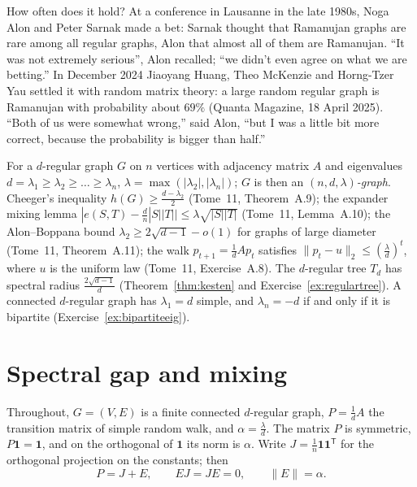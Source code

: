 How often does it hold? At a conference in Lausanne in the late 1980s, Noga Alon and Peter Sarnak made a bet: Sarnak thought that Ramanujan graphs are rare among all regular graphs, Alon that almost all
of them are Ramanujan. ``It was not extremely serious'', Alon recalled; ``we didn't even agree on what we are betting.'' In December 2024 Jiaoyang Huang, Theo McKenzie and Horng-Tzer Yau settled it with
random matrix theory: a large random regular graph is Ramanujan with probability about $69\%$ (Quanta Magazine, 18 April 2025). ``Both of us were somewhat wrong,'' said Alon, ``but I was a little bit more
correct, because the probability is bigger than half.''

\begin{reminder}
For a $d$-regular graph $G$ on $n$ vertices with adjacency matrix $A$ and eigenvalues $d=\lambda_1\ge\lambda_2\ge\dots\ge\lambda_n$, $\lambda=\max(|\lambda_2|,|\lambda_n|)$; $G$ is then an \emph{$(n,d,\lambda)$-graph}.
Cheeger's inequality $h(G)\ge\frac{d-\lambda_2}2$ (Tome~11, Theorem~A.9); the expander mixing lemma $|e(S,T)-\frac dn|S||T||\le\lambda\sqrt{|S||T|}$ (Tome~11, Lemma~A.10); the Alon--Boppana bound
$\lambda_2\ge2\sqrt{d-1}-o(1)$ for graphs of large diameter (Tome~11, Theorem~A.11); the walk $p_{t+1}=\frac1dAp_t$ satisfies $\|p_t-u\|_2\le(\frac\lambda d)^t$, where $u$ is the uniform law (Tome~11, Exercise~A.8).
The $d$-regular tree $T_d$ has spectral radius $\frac{2\sqrt{d-1}}d$ (Theorem~\ref{thm:kesten} and Exercise~\ref{ex:regulartree}). A connected $d$-regular graph has $\lambda_1=d$ simple, and $\lambda_n=-d$ if and only if it is bipartite
(Exercise~\ref{ex:bipartiteeig}).
\end{reminder}

\section{Spectral gap and mixing}

Throughout, $G=(V,E)$ is a finite connected $d$-regular graph, $P=\frac1dA$ the transition matrix of simple random walk, and $\alpha=\frac\lambda d$. The matrix $P$ is symmetric, $P\mathbf 1=\mathbf 1$, and on the orthogonal of
$\mathbf 1$ its norm is $\alpha$. Write $J=\frac1n\mathbf 1\mathbf 1^{\mathsf T}$ for the orthogonal projection on the constants; then
\begin{equation}\label{eq:pje}
P=J+E,\qquad EJ=JE=0,\qquad\|E\|=\alpha.
\end{equation}

